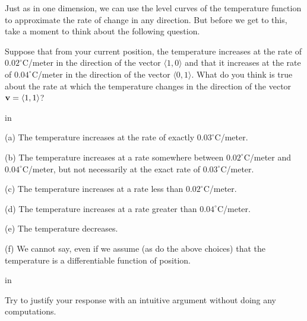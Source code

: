 \documentclass{ximera}
\newcommand{\pskip}{\vskip 0.1 in}
\begin{document}
Just as in one dimension, we can use the level curves of the temperature function to approximate the rate of change in any direction. But before we get to this, take a moment to think about the following question.

\begin{question}  \label{Qwerder432}
Suppose that from your current position, the temperature increases at the rate of $0.02^\circ$C/meter in the direction of the vector $\langle 1, 0 \rangle$ and that it increases at the rate of $0.04^\circ$C/meter in the direction of the vector $\langle 0,1\rangle$. What do you think is true about the rate at which the temperature changes in the direction of the vector ${\bf v} = \langle 1,1\rangle$?

\pskip

(a) The temperature increases at the rate of exactly $0.03^\circ$C/meter.

(b) The temperature increases at a rate somewhere between $0.02^\circ$C/meter and $0.04^\circ$C/meter, but not necessarily at the exact rate of $0.03^\circ$C/meter.

(c) The temperature increases at a rate less than $0.02^\circ$C/meter.

(d) The temperature increases at a rate greater than $0.04^\circ$C/meter.

(e) The temperature decreases.

(f) We cannot say, even if we assume (as do the above choices) that the temperature is a differentiable function of position.

\pskip

Try to justify your response with an intuitive argument without doing any computations.


\end{question}
\end{document}
